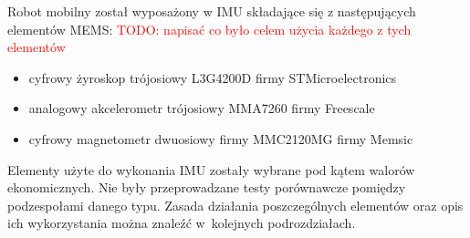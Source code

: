 Robot mobilny został wyposażony w IMU składające się z następujących elementów
MEMS:
\textcolor{red}{TODO: napisać co było celem użycia każdego z tych elementów}
\begin{itemize}
  \item cyfrowy żyroskop trójosiowy L3G4200D firmy STMicroelectronics
  \item analogowy akcelerometr trójosiowy MMA7260 firmy Freescale
  \item cyfrowy magnetometr dwuosiowy firmy MMC2120MG firmy Memsic
\end{itemize}
Elementy użyte do wykonania IMU zostały wybrane pod kątem walorów ekonomicznych. 
Nie były przeprowadzane testy porównawcze pomiędzy podzespołami danego typu.
Zasada działania poszczególnych elementów oraz opis ich wykorzystania można znaleźć w~kolejnych podrozdziałach.
